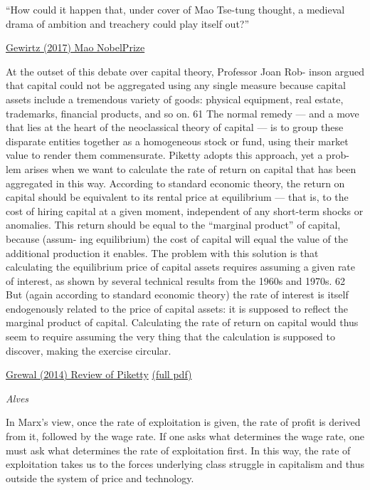 \documentclass[
]{book}
\begin{document}
``How could it happen that, under cover of Mao Tse-tung thought, a medieval drama of ambition and treachery could play itself out?''

\href{https://chinachannel.org/2017/12/13/fellow-travellers-tale/}{Gewirtz (2017) Mao NobelPrize}

At the outset of this debate over capital theory, Professor Joan Rob-
inson argued that capital could not be aggregated using any single
measure because capital assets include a tremendous variety of goods:
physical equipment, real estate, trademarks, financial products, and so
on. 61 The normal remedy --- and a move that lies at the heart of the
neoclassical theory of capital --- is to group these disparate entities
together as a homogeneous stock or fund, using their market value to
render them commensurate. Piketty adopts this approach, yet a prob-
lem arises when we want to calculate the rate of return on capital that
has been aggregated in this way. According to standard economic theory,
the return on capital should be equivalent to its rental price at
equilibrium --- that is, to the cost of hiring capital at a given moment,
independent of any short-term shocks or anomalies. This return
should be equal to the ``marginal product'' of capital, because (assum-
ing equilibrium) the cost of capital will equal the value of the
additional production it enables. The problem with this solution is that
calculating the equilibrium price of capital assets requires assuming a
given rate of interest, as shown by several technical results from the
1960s and 1970s. 62 But (again according to standard economic theory)
the rate of interest is itself endogenously related to the price of capital
assets: it is supposed to reflect the marginal product of capital.
Calculating the rate of return on capital would thus seem to require
assuming the very thing that the calculation is supposed to discover, making
the exercise circular.

\href{https://harvardlawreview.org/2014/12/the-laws-of-capitalism/}{Grewal (2014) Review of Piketty}
\href{pdf/Grewal_2014_laws_of_Capitalism.pdf}{(full pdf)}

\emph{Alves}

In Marx's view, once the rate of exploitation is given, the rate of profit is derived
from it, followed by the wage rate. If one asks what determines the wage rate, one
must ask what determines the rate of exploitation first. In this way, the rate of
exploitation takes us to the forces underlying class struggle in capitalism and thus
outside the system of price and technology.
\end{document}
